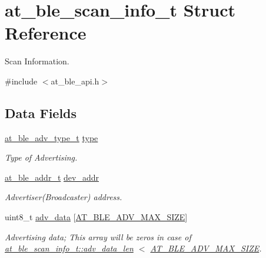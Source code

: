 \hypertarget{structat__ble__scan__info__t}{}\section{at\+\_\+ble\+\_\+scan\+\_\+info\+\_\+t Struct Reference}
\label{structat__ble__scan__info__t}


Scan Information.  




{\ttfamily \#include $<$at\+\_\+ble\+\_\+api.\+h$>$}

\subsection*{Data Fields}
\begin{DoxyCompactItemize}
\item 
\mbox{\hyperlink{at__ble__api_8h_a6c5e17c16e2d49e866f2f1effd646741}{at\+\_\+ble\+\_\+adv\+\_\+type\+\_\+t}} \mbox{\hyperlink{structat__ble__scan__info__t_aad7b738a689480d37a637145af51978d}{type}}
\begin{DoxyCompactList}\small\item\em Type of Advertising. \end{DoxyCompactList}\item 
\mbox{\hyperlink{structat__ble__addr__t}{at\+\_\+ble\+\_\+addr\+\_\+t}} \mbox{\hyperlink{structat__ble__scan__info__t_a2ba08a1eda716380203dae4e72fda99e}{dev\+\_\+addr}}
\begin{DoxyCompactList}\small\item\em Advertiser(\+Broadcaster) address. \end{DoxyCompactList}\item 
uint8\+\_\+t \mbox{\hyperlink{structat__ble__scan__info__t_a4700ff1a40c166a4ac7ee2738d3f8cef}{adv\+\_\+data}} \mbox{[}\mbox{\hyperlink{at__ble__api_8h_addd26ee157ad73fa2ec9bdebf27c85b3}{A\+T\+\_\+\+B\+L\+E\+\_\+\+A\+D\+V\+\_\+\+M\+A\+X\+\_\+\+S\+I\+ZE}}\mbox{]}
\begin{DoxyCompactList}\small\item\em Advertising data; This array will be zeros in case of \mbox{\hyperlink{structat__ble__scan__info__t_a75fd7fdf06a003b4e9b217d58cd6b077}{at\+\_\+ble\+\_\+scan\+\_\+info\+\_\+t\+::adv\+\_\+data\+\_\+len}} $<$ \mbox{\hyperlink{at__ble__api_8h_addd26ee157ad73fa2ec9bdebf27c85b3}{A\+T\+\_\+\+B\+L\+E\+\_\+\+A\+D\+V\+\_\+\+M\+A\+X\+\_\+\+S\+I\+ZE}}. \end{DoxyCompactList}\item 

\end{DoxyCompactItemize}
